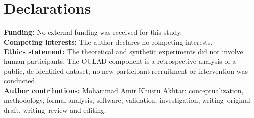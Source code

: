 \documentclass[11pt]{article}
\begin{document}
\section*{Declarations}
\textbf{Funding:} No external funding was received for this study.\\
\textbf{Competing interests:} The author declares no competing interests.\\
\textbf{Ethics statement:} The theoretical and synthetic experiments did not involve human participants. The OULAD component is a retrospective analysis of a public, de-identified dataset; no new participant recruitment or intervention was conducted.\\
\textbf{Author contributions:} Mohammad Amir Khusru Akhtar: conceptualization, methodology, formal analysis, software, validation, investigation, writing--original draft, writing--review and editing.

\begingroup\small\setlength{\bibitemsep}{0.35\baselineskip}\printbibliography\endgroup
\end{document}
